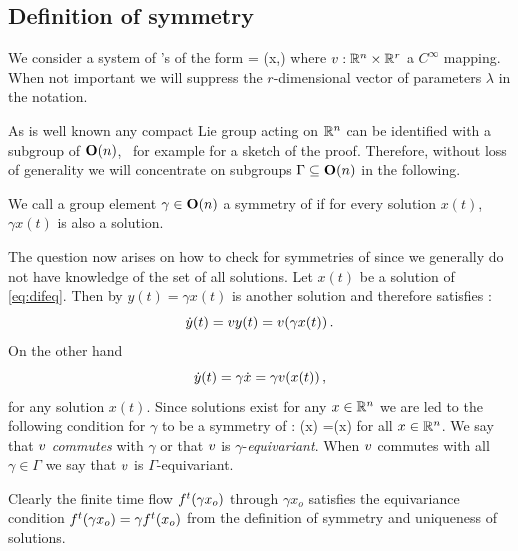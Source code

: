 \renewcommand{\inputfile}{\version\ - edited 2007-03-11 symODEs}

\subsection{Definition of symmetry}

We consider a system of \ode's of the form
\beq
	 = \vf(x,\lambda)
	\label{eq:difeq}
\eeq
where $v: \mathbb{R}^{n}\times\mathbb{R}^{r}$ a $C^\infty$ mapping. When
not important we will suppress the $r$-dimensional vector of parameters
$\lambda$ in the notation.

As is well known any compact Lie group acting on $\mathbb{R}^{n}$ can be identified
with a subgroup of $\mathbf{O}(n)$, \cf\ for example 
for a sketch of the proof. Therefore, without loss of generality
we will concentrate on subgroups $\Gamma\subseteq\mathbf{O}(n)$ in the following.

\begin{definition}
\label{def:symmetry}
We call a group element $\gamma\in\mathbf{O}(n)$ a symmetry of  if for every solution
$x(t)$, $\gamma x(t)$ is also a solution.
\end{definition}

The question now arises on how to check for symmetries of  since
we generally do not have knowledge of the set of all solutions. Let $x(t)$ be a solution
of \ref{eq:difeq}. Then by  $y(t)=\gamma x(t)$ is another solution
and therefore satisfies :
\[
 \dot{y}(t)=v{y(t)}=v(\gamma x(t))\,.
\]
On the other hand
\[
 \dot{y}(t)=\gamma \dot{x} = \gamma v(x(t))\,,
\]
for any solution $x(t)$. Since solutions exist for any $x\in\mathbb{R}^{n}$ we are led to the following
condition for $\gamma$ to be a symmetry of :
\beq
	\vf(\gamma x) =\gamma \vf(x)
	\label{eq:equiv}
\eeq
for all $x\in\mathbb{R}^{n}$. We say that $v$ \emph{commutes} with $\gamma$ or that $v$ is $\gamma$-\emph{equivariant}.
When $v$ commutes with all $\gamma\in\Gamma$ we say that $v$ is $\Gamma$-equivariant.

Clearly the finite time flow ${f^{t}(\gamma x_o)}$ through $\gamma x_o$
satisfies the equivariance condition ${f^{t}(\gamma x_o)}=\gamma {f^{t}(x_o)}$ from
the definition of symmetry and uniqueness of solutions.


